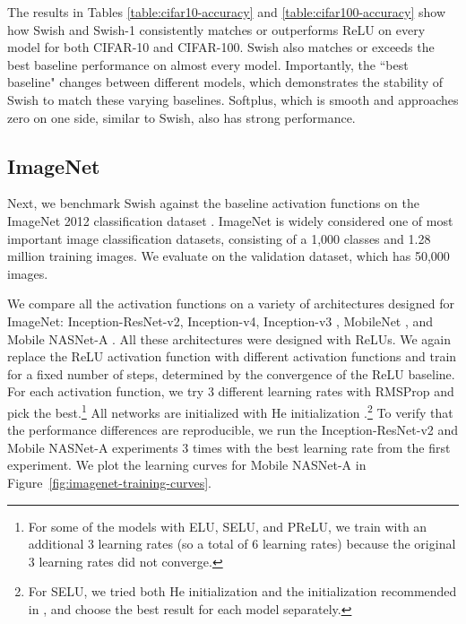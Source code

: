 \documentclass{article} %
\begin{document}
The results in Tables \ref{table:cifar10-accuracy} and \ref{table:cifar100-accuracy} show how Swish and Swish-1 consistently matches or outperforms ReLU on every model for both CIFAR-10 and CIFAR-100. Swish also matches or exceeds the best baseline performance on almost every model. Importantly, the ``best baseline" changes between different models, which demonstrates the stability of Swish to match these varying baselines. Softplus, which is smooth and approaches zero on one side, similar to Swish, also has strong performance.

\subsection{ImageNet}
\label{ssec:experiments-imagenet}

Next, we benchmark Swish against the baseline activation functions on the ImageNet 2012 classification dataset \citep{russakovsky2015imagenet}. ImageNet is widely considered one of most important image classification datasets, consisting of a 1,000 classes and 1.28 million training images. We evaluate on the validation dataset, which has 50,000 images.

We compare all the activation functions on a variety of architectures designed for ImageNet: Inception-ResNet-v2, Inception-v4, Inception-v3 \citep{szegedy2017inception}, MobileNet \citep{howard2017mobilenets}, and Mobile NASNet-A \citep{zoph2017learning}. All these architectures were designed with ReLUs. We again replace the ReLU activation function with different activation functions and train for a fixed number of steps, determined by the convergence of the ReLU baseline. For each activation function, we try 3 different learning rates with RMSProp \citep{tieleman2012lecture} and pick the best.\footnote{For some of the models with ELU, SELU, and PReLU, we train with an additional 3 learning rates (so a total of 6 learning rates) because the original 3 learning rates did not converge.} All networks are initialized with He initialization \citep{he2015delving}.\footnote{For SELU, we tried both He initialization and the initialization recommended in \citet{klambauer2017self}, and choose the best result for each model separately.} To verify that the performance differences are reproducible, we run the Inception-ResNet-v2 and Mobile NASNet-A experiments 3 times with the best learning rate from the first experiment. We plot the learning curves for Mobile NASNet-A in Figure~\ref{fig:imagenet-training-curves}.
\end{document}
